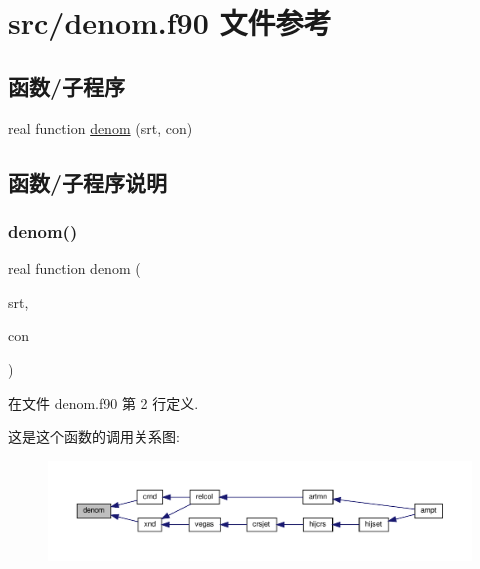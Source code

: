 \hypertarget{denom_8f90}{}\section{src/denom.f90 文件参考}
\label{denom_8f90}
\subsection*{函数/子程序}
\begin{DoxyCompactItemize}
\item 
real function \mbox{\hyperlink{denom_8f90_a35588ee9593f63a6af5581157fddd902}{denom}} (srt, con)
\end{DoxyCompactItemize}


\subsection{函数/子程序说明}
\mbox{\label{denom_8f90_a35588ee9593f63a6af5581157fddd902}} 
\subsubsection{\texorpdfstring{denom()}{denom()}}
{\footnotesize\ttfamily real function denom (\begin{DoxyParamCaption}\item[{}]{srt,  }\item[{}]{con }\end{DoxyParamCaption})}



在文件 denom.\+f90 第 2 行定义.

这是这个函数的调用关系图\+:
\nopagebreak
\begin{figure}[H]
\begin{center}
\leavevmode
\includegraphics[width=350pt]{denom_8f90_a35588ee9593f63a6af5581157fddd902_icgraph}
\end{center}
\end{figure}

